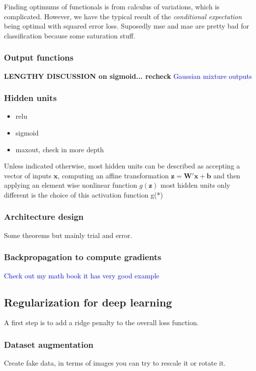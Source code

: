 \documentclass{article}
\newcommand{\tblue}[1]{\textcolor{blue}{#1}}
\begin{document}
Finding optimums of functionals is from calculus of variations, which is complicated.
However, we have the typical result of the \textit{conditional expectation} being optimal with squared error loss. Suposedly mse and mae are pretty bad for classification because some saturation stuff.

\subsubsection{Output functions}
\textbf{LENGTHY DISCUSSION on sigmoid... recheck}
\tblue{Gaussian mixture outputs}
\subsubsection{Hidden units}
\begin{itemize}
    \item relu 
    \item sigmoid
    \item maxout, check in more depth
\end{itemize}
Unless indicated otherwise, most hidden units can be described as accepting
a vector of inputs $ \textbf{x} $, computing an affine transformation $\textbf{z} = \textbf{W}'\textbf{x} + \textbf{b}$
and then applying an element wise nonlinear function $g(\textbf{z})$ most hidden units only 
different is the choice of this activation function g(*)

\subsubsection{Architecture design}
Some theorems but mainly trial and error.

\subsubsection{Backpropagation to compute gradients}
\tblue{Check out my math book it has very good example}

\subsection{Regularization for deep learning}
A first step is to add a ridge penalty to the overall loss function.


\subsubsection{Dataset augmentation}
Create fake data, in terms of images you can try to rescale it or rotate it.
\end{document}
